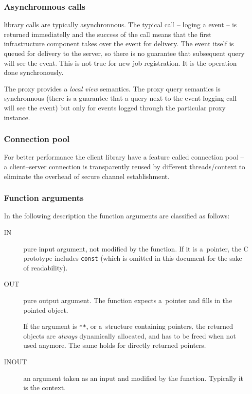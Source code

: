 \subsubsection{Asynchronnous calls}
\LB library calls are typically asynchronnous. The typical call --
loging a event -- is returned immediatelly and the success of the call
means that the first \LB infrastructure component takes over the event
for delivery. The event itself is queued for delivery to the \LB
server, so there is no guarantee that subsequent query will see the
event. This is not true for new job registration. It is the operation done
synchronously.

The \LB proxy provides a \emph{local view} semantics. The \LB proxy
query semantics is synchronnous (there is a guarantee that a query
next to the event logging call will see the event) but only for events
logged through the particular \LB proxy instance.

\subsubsection{Connection pool}
For better performance the \LB client library have a feature called
connection pool -- a client--server connection is transparently reused
by different threads/context to eliminate the overhead of secure
channel establishment.

\subsubsection{Function arguments}
In the following description the function arguments are classified as follows:
\begin{description}
\item[IN] pure input argument, not modified by the function.
If it is a~pointer, the C prototype includes \verb'const' (which is omitted in
this document for the sake of readability).
\item[OUT] pure output argument. The function expects a~pointer and fills in
the pointed object.

If the argument is \verb'**', or a~structure containing pointers,
the returned objects are \emph{always} dynamically allocated,
and has to be freed when not used anymore.
The same holds for directly returned pointers.

\item[INOUT] an argument taken as an input and modified by the function.
Typically it is the \LB context.

\end{description}

